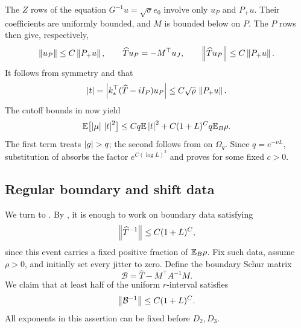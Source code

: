 The $Z$ rows of the equation $G^{-1}u=\sqrt\sigma e_0$ involve only
$u_P$ and $P_+u$. Their coefficients are uniformly bounded, and $M$
is bounded below on $P$. The $P$ rows then give, respectively,
\[
 \left\lVert u_P\right\rVert\le C\left\lVert P_+u\right\rVert,\qquad
 \widehat T u_P=-M^\top u_J,\qquad
 \left\lVert\widehat T u_P\right\rVert\le C\left\lVert P_+u\right\rVert.
\]
It follows from symmetry and  that
\begin{equation}
 \left\lvert t\right\rvert
 =\left\lvert k_*^\top(\widehat T-iI_P)u_P\right\rvert
 \le C\sqrt\rho\,\left\lVert P_+u\right\rVert.
 \label{trans:source-control}
\end{equation}
The cutoff bounds in  now yield
\begin{equation}
 \mathbb E\bigl[\left\lvert\mu\right\rvert\,\left\lvert t\right\rvert^2\bigr]
 \le Cq\mathbb E\left\lvert t\right\rvert^2+C(1+L)^Cq\mathbb E_B\rho.
 \label{trans:relative-prelower}
\end{equation}
The first term treats $\left\lvert g\right\rvert>q$; the second follows from
 on $\Omega_q$.
Since $q=e^{-\nu L}$, substitution of  absorbs
the factor $e^{C(\log L)^2}$ and proves  for
some fixed $c>0$.

\subsection{Regular boundary and shift data}

We turn to . By , it is enough
to work on boundary data satisfying
\begin{equation}
 \left\lVert\widehat T^{-1}\right\rVert\le C(1+L)^C,
 \label{trans:good-boundary}
\end{equation}
since this event carries a fixed positive fraction of $\mathbb E_B\rho$.
Fix such data, assume $\rho>0$, and initially set every jitter to zero.
Define the boundary Schur matrix
\[
 \mathcal B=\widehat T-M^\top A^{-1}M.
\]
We claim that at least half of the uniform $r$-interval satisfies
\begin{equation}
 \left\lVert\mathcal B^{-1}\right\rVert\le C(1+L)^C.
 \label{trans:regular-r}
\end{equation}
All exponents in this assertion can be fixed before $D_2,D_3$.

